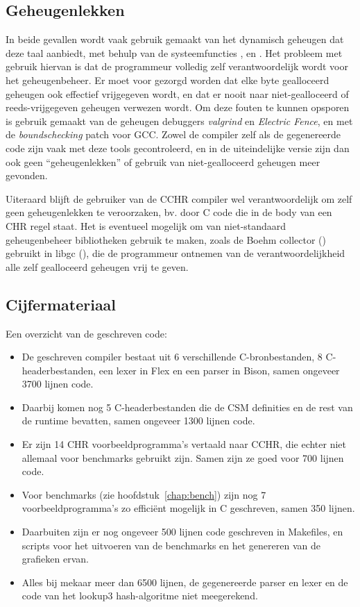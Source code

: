 \subsection{Geheugenlekken} \label{sec:memleaks}


In beide gevallen wordt vaak gebruik gemaakt van het dynamisch geheugen dat deze taal aanbiedt, met behulp van de systeemfuncties ,  en . Het probleem met gebruik hiervan is dat de programmeur volledig zelf verantwoordelijk wordt voor het geheugenbeheer. Er moet voor gezorgd worden dat elke byte gealloceerd geheugen ook effectief vrijgegeven wordt, en dat er nooit naar niet-gealloceerd of reeds-vrijgegeven geheugen verwezen wordt. Om deze fouten te kunnen opsporen is gebruik gemaakt van de geheugen debuggers {\em valgrind} en {\em Electric Fence}, en met de  {\em boundschecking} patch voor GCC. Zowel de compiler zelf als de gegenereerde code zijn vaak met deze tools gecontroleerd, en in de uiteindelijke versie zijn dan ook geen ``geheugenlekken'' of gebruik van niet-gealloceerd geheugen meer gevonden.

Uiteraard blijft de gebruiker van de CCHR compiler wel verantwoordelijk om zelf geen geheugenlekken te veroorzaken, bv. door C code die in de body van een CHR regel staat. Het is eventueel mogelijk om van niet-standaard geheugenbeheer bibliotheken gebruik te maken, zoals de Boehm collector (\cite{boehmgc}) gebruikt in libgc (\cite{libgc}), die de programmeur ontnemen van de verantwoordelijkheid alle zelf gealloceerd geheugen vrij te geven.

\subsection{Cijfermateriaal} \label{sec:cijfer}

Een overzicht van de geschreven code: \begin{itemize}
\item De geschreven compiler bestaat uit 6 verschillende C-bronbestanden, 8 C-headerbestanden, een lexer in Flex en een parser in Bison, samen ongeveer 3700 lijnen code.
\item Daarbij komen nog 5 C-headerbestanden die de CSM definities en de rest van de runtime bevatten, samen ongeveer 1300 lijnen code.
\item Er zijn 14 CHR voorbeeldprogramma's vertaald naar CCHR, die echter niet allemaal voor benchmarks gebruikt zijn. Samen zijn ze goed voor 700 lijnen code.
\item Voor benchmarks (zie hoofdstuk~\ref{chap:bench}) zijn nog 7 voorbeeldprogramma's zo effici\"ent mogelijk in C geschreven, samen 350 lijnen.
\item Daarbuiten zijn er nog ongeveer 500 lijnen code geschreven in Makefiles, en scripts voor het uitvoeren van de benchmarks en het genereren van de grafieken ervan.
\item Alles bij mekaar meer dan 6500 lijnen, de gegenereerde parser en lexer en de code van het lookup3 hash-algoritme niet meegerekend.
\end{itemize}

